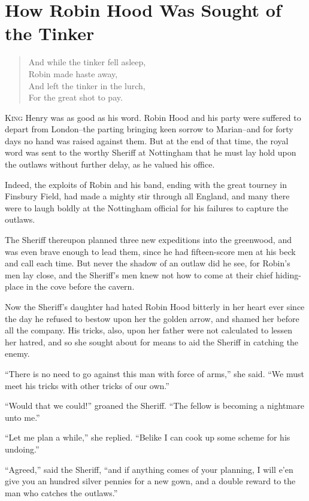 \chapter{How Robin Hood Was Sought of the Tinker}

\begin{quote}
And while the tinker fell asleep,\\
Robin made haste away,\\
And left the tinker in the lurch,\\
For the great shot to pay.
\end{quote}

\lettrine{K}{ing} Henry was as good as his word. Robin Hood and his party were
suffered to depart from London--the parting bringing keen sorrow to
Marian--and for forty days no hand was raised against them. But at the
end of that time, the royal word was sent to the worthy Sheriff at
Nottingham that he must lay hold upon the outlaws without further delay,
as he valued his office.

Indeed, the exploits of Robin and his band, ending with the great
tourney in Finsbury Field, had made a mighty stir through all England,
and many there were to laugh boldly at the Nottingham official for his
failures to capture the outlaws.

The Sheriff thereupon planned three new expeditions into the greenwood,
and was even brave enough to lead them, since he had fifteen-score men
at his beck and call each time. But never the shadow of an outlaw did he
see, for Robin's men lay close, and the Sheriff's men knew not how to
come at their chief hiding-place in the cove before the cavern.

Now the Sheriff's daughter had hated Robin Hood bitterly in her heart
ever since the day he refused to bestow upon her the golden arrow, and
shamed her before all the company. His tricks, also, upon her father
were not calculated to lessen her hatred, and so she sought about for
means to aid the Sheriff in catching the enemy.

``There is no need to go against this man with force of arms,'' she
said. ``We must meet his tricks with other tricks of our own.''

``Would that we could!'' groaned the Sheriff. ``The fellow is becoming a
nightmare unto me.''

``Let me plan a while,'' she replied. ``Belike I can cook up some scheme
for his undoing.''

``Agreed,'' said the Sheriff, ``and if anything comes of your planning,
I will e'en give you an hundred silver pennies for a new gown, and a
double reward to the man who catches the outlaws.''

